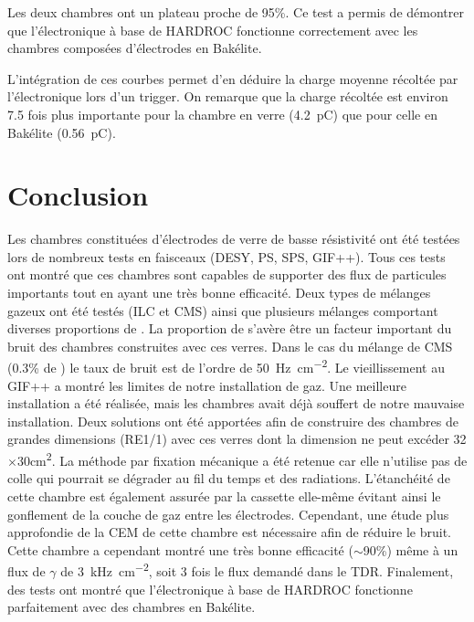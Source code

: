 Les deux chambres ont un plateau proche de \num{95}\%. Ce test a permis de démontrer que l'électronique à base de HARDROC fonctionne correctement avec les chambres composées d'électrodes en Bakélite.

L'intégration de ces courbes permet d'en déduire la charge moyenne récoltée par l'électronique lors d'un trigger. On remarque que la charge récoltée est environ \num{7.5} fois plus importante pour la chambre en verre (\SI{4.2}{\pico\coulomb}) que pour celle en Bakélite (\SI{0.56}{\pico\coulomb}).

\section{Conclusion}

Les chambres constituées d'électrodes de verre de basse résistivité ont été testées lors de nombreux tests en faisceaux (DESY, PS, SPS, GIF++). Tous ces tests ont montré que ces chambres sont capables de supporter des flux de particules importants tout en ayant une très bonne efficacité. Deux types de mélanges gazeux ont été testés (ILC et CMS) ainsi que plusieurs mélanges comportant diverses proportions de . La proportion de  s'avère être un facteur important du bruit des chambres construites avec ces verres. Dans le cas du mélange de CMS (\num{0.3}\% de ) le taux de bruit est de l'ordre de \SI{50}{\hertz\per\square\centi\meter}. Le vieillissement au GIF++ a montré les limites de notre installation de gaz. Une meilleure installation a été réalisée, mais les chambres avait déjà souffert de notre mauvaise installation. Deux solutions ont été apportées afin de construire des chambres de grandes dimensions (RE1/1) avec ces verres dont la dimension ne peut excéder \num{32}$\times$\num{30}\si{\square\centi\meter}. La méthode par fixation mécanique a été retenue car elle n'utilise pas de colle qui pourrait se dégrader au fil du temps et des radiations. L'étanchéité de cette chambre est également assurée par la cassette elle-même évitant ainsi le gonflement de la couche de gaz entre les électrodes. Cependant, une étude plus approfondie de la CEM de cette chambre est nécessaire afin de réduire le bruit. Cette chambre a cependant montré une très bonne efficacité ($\sim$\num{90}\%) même à un flux de $\gamma$ de \SI{3}{\kilo\hertz\per\square\centi\meter}, soit \num{3} fois le flux demandé dans le TDR. Finalement, des tests ont montré que l'électronique à base de HARDROC fonctionne parfaitement avec des chambres en Bakélite.